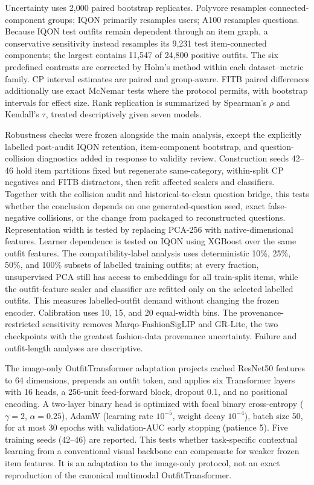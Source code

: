 \documentclass[preprint,12pt]{elsarticle}
\begin{document}
Uncertainty uses 2,000 paired bootstrap replicates. Polyvore resamples connected-component groups; IQON primarily resamples users; A100 resamples questions. Because IQON test outfits remain dependent through an item graph, a conservative sensitivity instead resamples its 9,231 test item-connected components; the largest contains 11,547 of 24,800 positive outfits. The six predefined contrasts are corrected by Holm's method within each dataset--metric family. CP interval estimates are paired and group-aware. FITB paired differences additionally use exact McNemar tests where the protocol permits, with bootstrap intervals for effect size. Rank replication is summarized by Spearman's $\rho$ and Kendall's $\tau$, treated descriptively given seven models.

Robustness checks were frozen alongside the main analysis, except the explicitly labelled post-audit IQON retention, item-component bootstrap, and question-collision diagnostics added in response to validity review. Construction seeds 42--46 hold item partitions fixed but regenerate same-category, within-split CP negatives and FITB distractors, then refit affected scalers and classifiers. Together with the collision audit and historical-to-clean question bridge, this tests whether the conclusion depends on one generated-question seed, exact false-negative collisions, or the change from packaged to reconstructed questions. Representation width is tested by replacing PCA-256 with native-dimensional features. Learner dependence is tested on IQON using XGBoost over the same outfit features. The compatibility-label analysis uses deterministic 10\%, 25\%, 50\%, and 100\% subsets of labelled training outfits; at every fraction, unsupervised PCA still has access to embeddings for all train-split items, while the outfit-feature scaler and classifier are refitted only on the selected labelled outfits. This measures labelled-outfit demand without changing the frozen encoder. Calibration uses 10, 15, and 20 equal-width bins. The provenance-restricted sensitivity removes Marqo-FashionSigLIP and GR-Lite, the two checkpoints with the greatest fashion-data provenance uncertainty. Failure and outfit-length analyses are descriptive.

The image-only OutfitTransformer adaptation projects cached ResNet50 features to 64 dimensions, prepends an outfit token, and applies six Transformer layers with 16 heads, a 256-unit feed-forward block, dropout 0.1, and no positional encoding. A two-layer binary head is optimized with focal binary cross-entropy ($\gamma=2$, $\alpha=0.25$), AdamW (learning rate $10^{-5}$, weight decay $10^{-4}$), batch size 50, for at most 30 epochs with validation-AUC early stopping (patience 5). Five training seeds (42--46) are reported. This tests whether task-specific contextual learning from a conventional visual backbone can compensate for weaker frozen item features. It is an adaptation to the image-only protocol, not an exact reproduction of the canonical multimodal OutfitTransformer.
\end{document}
